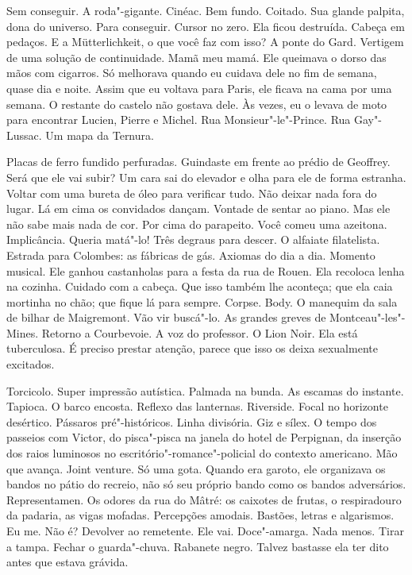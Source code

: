 Sem conseguir. A roda"-gigante. Cinéac. Bem fundo. Coitado. Sua glande
palpita, dona do universo. Para conseguir. Cursor no zero. Ela ficou
destruída. Cabeça em pedaços. E a Mütterlichkeit, o que você faz com
isso? A ponte do Gard. Vertigem de uma solução de continuidade. Mamã meu
mamá. Ele queimava o dorso das mãos com cigarros. Só melhorava quando eu
cuidava dele no fim de semana, quase dia e noite. Assim que eu voltava
para Paris, ele ficava na cama por uma semana. O restante do castelo não
gostava dele. Às vezes, eu o levava de moto para encontrar Lucien,
Pierre e Michel. Rua Monsieur"-le"-Prince. Rua Gay"-Lussac. Um mapa da
Ternura.

Placas de ferro fundido perfuradas. Guindaste em frente ao prédio de
Geoffrey. Será que ele vai subir? Um cara sai do elevador e olha para
ele de forma estranha. Voltar com uma bureta de óleo para verificar
tudo. Não deixar nada fora do lugar. Lá em cima os convidados dançam.
Vontade de sentar ao piano. Mas ele não sabe mais nada de cor. Por cima
do parapeito. Você comeu uma azeitona. Implicância. Queria matá"-lo! Três
degraus para descer. O alfaiate filatelista. Estrada para Colombes: as
fábricas de gás. Axiomas do dia a dia. Momento musical. Ele ganhou
castanholas para a festa da rua de Rouen. Ela recoloca lenha na cozinha.
Cuidado com a cabeça. Que isso também lhe aconteça; que ela caia
mortinha no chão; que fique lá para sempre. Corpse. Body. O manequim da
sala de bilhar de Maigremont. Vão vir buscá"-lo. As grandes greves de
Montceau"-les"-Mines. Retorno a Courbevoie. A voz do professor. O Lion
Noir. Ela está tuberculosa. É preciso prestar atenção, parece que isso
os deixa sexualmente excitados.

Torcicolo. Super impressão autística. Palmada na bunda. As escamas do
instante. Tapioca. O barco encosta. Reflexo das lanternas. Riverside.
Focal no horizonte desértico. Pássaros pré"-históricos. Linha divisória.
Giz e sílex. O tempo dos passeios com Victor, do pisca"-pisca na janela
do hotel de Perpignan, da inserção dos raios luminosos no
escritório"-romance"-policial do contexto americano. Mão que avança. Joint
venture. Só uma gota. Quando era garoto, ele organizava os bandos no
pátio do recreio, não só seu próprio bando como os bandos adversários.
Representamen. Os odores da rua do Mâtré: os caixotes de frutas, o
respiradouro da padaria, as vigas mofadas. Percepções amodais. Bastões,
letras e algarismos. Eu me. Não é? Devolver ao remetente. Ele vai.
Doce"-amarga. Nada menos. Tirar a tampa. Fechar o guarda"-chuva. Rabanete
negro. Talvez bastasse ela ter dito antes que estava grávida.

